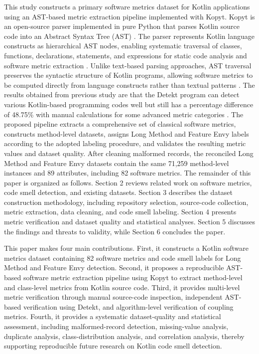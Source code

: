 \documentclass[]{einformatica}
\begin{document}
This study constructs a primary software metrics dataset for Kotlin applications using an AST-based metric extraction pipeline implemented with Kopyt. Kopyt is an open-source parser implemented in pure Python that parses Kotlin source code into an Abstract Syntax Tree (AST) \cite{pypi_kopyt}. The parser represents Kotlin language constructs as hierarchical AST nodes, enabling systematic traversal of classes, functions, declarations, statements, and expressions for static code analysis and software metric extraction \cite{kotlin_spec}. Unlike text-based parsing approaches, AST traversal preserves the syntactic structure of Kotlin programs, allowing software metrics to be computed directly from language constructs rather than textual patterns \cite{chen2023acerastbasedgraphgenerator}. The results obtained from previous study are that the Detekt program can detect various Kotlin-based programming codes well but still has a percentage difference of 48.75\% with manual calculations for some advanced metric categories \cite{WibowoICITDA2025}. The proposed pipeline extracts a comprehensive set of classical software metrics, constructs method-level datasets, assigns Long Method and Feature Envy labels according to the adopted labeling procedure, and validates the resulting metric values and dataset quality. After cleaning malformed records, the reconciled Long Method and Feature Envy datasets contain the same 71,259 method-level instances and 89 attributes, including 82 software metrics. The remainder of this paper is organized as follows. Section 2 reviews related work on software metrics, code smell detection, and existing datasets. Section 3 describes the dataset construction methodology, including repository selection, source-code collection, metric extraction, data cleaning, and code smell labeling. Section 4 presents metric verification and dataset quality and statistical analyses. Section 5 discusses the findings and threats to validity, while Section 6 concludes the paper.

This paper makes four main contributions. First, it constructs a Kotlin software metrics dataset containing 82 software metrics and code smell labels for Long Method and Feature Envy detection. Second, it proposes a reproducible AST-based software metric extraction pipeline using Kopyt to extract method-level and class-level metrics from Kotlin source code. Third, it provides multi-level metric verification through manual source-code inspection, independent AST-based verification using Detekt, and algorithm-level verification of coupling metrics. Fourth, it provides a systematic dataset-quality and statistical assessment, including malformed-record detection, missing-value analysis, duplicate analysis, class-distribution analysis, and correlation analysis, thereby supporting reproducible future research on Kotlin code smell detection.
\end{document}
